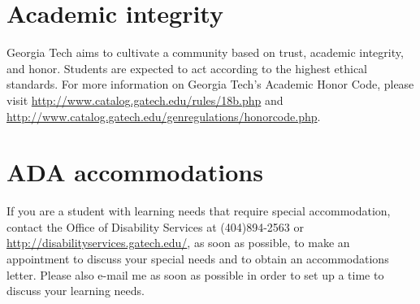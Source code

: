 \documentclass[
]{article}
\begin{document}
\hypertarget{academic-integrity}{%
\section{Academic integrity}\label{academic-integrity}}

Georgia Tech aims to cultivate a community based on trust, academic
integrity, and honor. Students are expected to act according to the
highest ethical standards. For more information on Georgia Tech's
Academic Honor Code, please visit
\url{http://www.catalog.gatech.edu/rules/18b.php} and
\url{http://www.catalog.gatech.edu/genregulations/honorcode.php}.

\hypertarget{ada-accommodations}{%
\section{ADA accommodations}\label{ada-accommodations}}

If you are a student with learning needs that require special
accommodation, contact the Office of Disability Services at
(404)894-2563 or \url{http://disabilityservices.gatech.edu/}, as soon as
possible, to make an appointment to discuss your special needs and to
obtain an accommodations letter. Please also e-mail me as soon as
possible in order to set up a time to discuss your learning needs.
\end{document}
